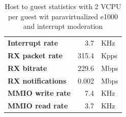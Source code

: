 \begin{table}
\begin{center}
\begin{tabular}{lrl}
\toprule
\textbf{Interrupt rate} & 3.7 & KHz\\
\textbf{RX packet rate} & 315.4 & Kpps\\
\textbf{RX bitrate} & 229.6 & Mbps\\
\textbf{RX notifications} & 0.002 & Mbps\\
\textbf{MMIO write rate} & 7.4 & KHz\\
\textbf{MMIO read rate} & 3.7 & KHz\\
\bottomrule
\end{tabular}
\end{center}
\caption{Host to guest statistics with 2 VCPU per guest wit paravirtualized e1000 and interrupt moderation}
\label{tab:e1000-par-rx-g2h2vcpu}
\end{table}
